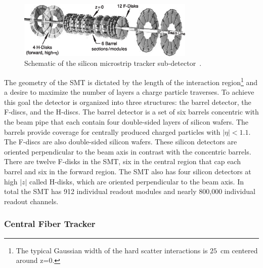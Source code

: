 \begin{figure}[!h!tbp]
\begin{center}
\includegraphics[width=0.75\textwidth]{eps/D0/SMT.eps}
\end{center}
\vspace{-0.1in}
\caption{Schematic of the silicon microstrip tracker sub-detector~\cite{Abazov:2005pn}.}
\label{SMT}
\end{figure}

The geometry of the SMT is dictated by the length of the interaction region\footnote{The typical Gaussian width of the hard scatter interactions is $25$~cm centered around z=0.} and a desire to maximize the number of layers a charge particle traverses. To achieve this goal the detector is organized into three structures: the barrel detector, the F-discs, and the H-discs. The barrel detector is a set of six barrels concentric with the beam pipe that each contain four double-sided layers of silicon wafers. The barrels provide coverage for centrally produced charged particles with $|\eta|<1.1$. The F-discs are also double-sided silicon wafers. These silicon detectors are oriented perpendicular to the beam axis in contrast with the concentric barrels. There are twelve F-disks in the SMT, six in the central region that cap each barrel and six in the forward region. The SMT also has four silicon detectors at high $|z|$ called H-disks, which are oriented perpendicular to the beam axis. In total the SMT has 912 individual readout modules and nearly 800,000 individual readout channels.


\subsubsection{Central Fiber Tracker}

